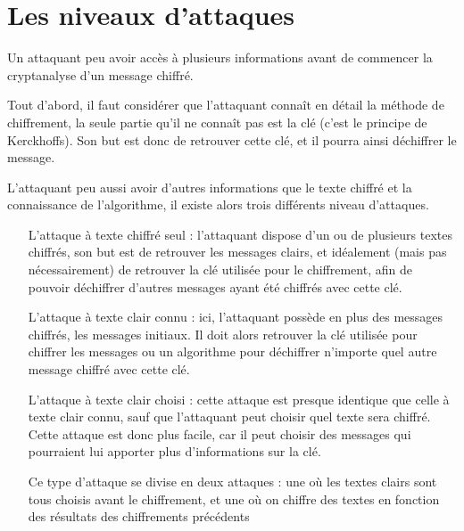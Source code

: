 \section{Les niveaux d'attaques}
Un attaquant peu avoir accès à plusieurs informations avant de
commencer la cryptanalyse d'un message chiffré.

Tout d'abord, il faut considérer que l'attaquant connaît en détail
la méthode de chiffrement, la seule partie qu'il ne connaît pas
est la clé (c'est le principe de
Kerckhoffs). Son but est donc de
retrouver cette clé, et il pourra ainsi déchiffrer le message.

L'attaquant peu aussi avoir d'autres informations que le texte
chiffré et la connaissance de l'algorithme, il existe alors trois
différents niveau d'attaques.

\begin{itemize}
  \renewcommand{\makelabel}[1]{\sffamily\textbf{#1}}
  \item[L'attaque à texte chiffré seul] :
    l'attaquant dispose d'un ou de plusieurs textes chiffrés, son but
    est de retrouver les messages clairs, et idéalement (mais pas
    nécessairement) de retrouver la clé utilisée pour le chiffrement,
    afin de pouvoir déchiffrer d'autres messages ayant été chiffrés
    avec cette clé.

  \item[L'attaque à texte clair connu] :
    ici, l'attaquant possède en plus des messages chiffrés, les
    messages initiaux. Il doit alors retrouver la clé utilisée pour 
    chiffrer les messages ou un algorithme pour déchiffrer n'importe
    quel autre message chiffré avec cette clé. 

  \item[L'attaque à texte clair choisi] :
    cette attaque est presque identique que celle à texte clair connu,
    sauf que l'attaquant peut choisir quel texte sera chiffré. Cette
    attaque est donc plus facile, car il peut choisir des messages qui
    pourraient lui apporter plus d'informations sur la clé.

    Ce type d'attaque se divise en deux attaques : une où les textes
    clairs sont tous choisis avant le chiffrement, et une où on
    chiffre des textes en fonction des résultats des chiffrements
    précédents

\end{itemize}
